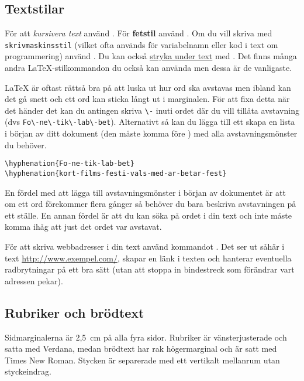 
\subsection{Textstilar}

För att \emph{kursivera text} använd . För \textbf{fetstil}
använd . Om du vill skriva med \texttt{skriv\-maskins\-stil}
(vilket ofta används för variabelnamn eller kod i text om programmering) använd
. Du kan också \underline{stryka under text} med
. Det finns många andra \LaTeX-stilkommandon du också kan
använda men dessa är de vanligaste.

\LaTeX{} är oftast rättså bra på att luska ut hur ord ska avstavas men ibland
kan det gå snett och ett ord kan sticka långt ut i marginalen. För att fixa
detta när det händer det kan du antingen skriva \verb|\-| inuti ordet där du
vill tillåta avstavning (dvs \verb|Fo\-ne\-tik\-lab\-bet|). Alternativt så kan
du lägga till ett skapa en lista i början av ditt dokument (den måste komma
före \verb||) med alla avstavningsmönster du behöver.

\begin{verbatim}
\hyphenation{Fo-ne-tik-lab-bet}
\hyphenation{kort-films-festi-vals-med-ar-betar-fest}
\end{verbatim}

En fördel med att lägga till avstavningsmönster i början av dokumentet är att
om ett ord förekommer flera gånger så behöver du bara beskriva avstavningen på
ett ställe. En annan fördel är att du kan söka på ordet i din text och inte
måste komma ihåg att just det ordet var avstavat.

För att skriva webbadresser i din text använd kommandot . Det
ser ut såhär i text \url{http://www.exempel.com/}, skapar en länk i texten och
hanterar eventuella radbrytningar på ett bra sätt (utan att stoppa in
bindestreck som förändrar vart adressen pekar).


\subsection{Rubriker och brödtext}

Sidmarginalerna är 2,5~cm på alla fyra sidor. Rubriker är vänsterjusterade och
satta med Verdana, medan brödtext har rak högermarginal och är satt med Times
New Roman. Stycken är separerade med ett vertikalt mellanrum utan styckeindrag.

